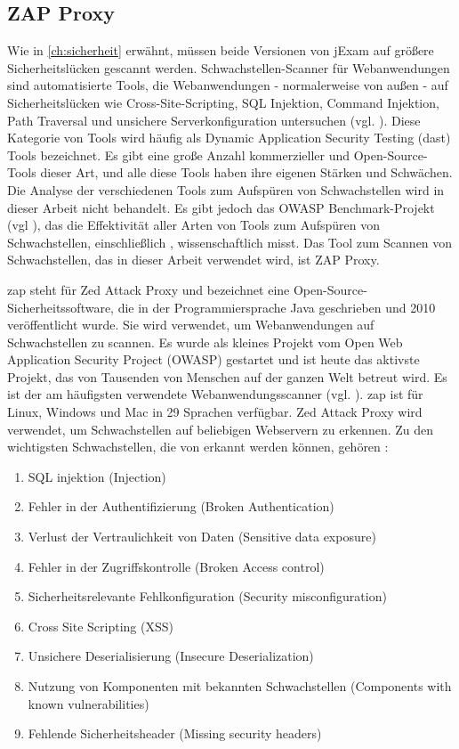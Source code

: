 \subsection{ZAP Proxy}

Wie in \autoref{ch:sicherheit} erwähnt, müssen beide Versionen von jExam
auf größere Sicherheitslücken gescannt werden. Schwachstellen-Scanner für
Webanwendungen sind automatisierte Tools, die Webanwendungen - normalerweise
von außen - auf Sicherheitslücken wie Cross-Site-Scripting, SQL Injektion,
Command Injektion, Path Traversal und unsichere Serverkonfiguration
untersuchen (vgl. \cite{vulscan}). Diese Kategorie von Tools wird häufig
als Dynamic Application Security Testing (\acs{dast}) Tools bezeichnet.
Es gibt eine große Anzahl kommerzieller und Open-Source-Tools dieser Art,
und alle diese Tools haben ihre eigenen Stärken und Schwächen. Die Analyse
der verschiedenen Tools zum Aufspüren von Schwachstellen wird in dieser
Arbeit nicht behandelt. Es gibt jedoch das OWASP Benchmark-Projekt
(vgl \cite{benchmark}), das die Effektivität aller Arten von Tools zum
Aufspüren von Schwachstellen, einschließlich , wissenschaftlich
misst. Das Tool zum Scannen von Schwachstellen, das in dieser Arbeit verwendet wird,
ist ZAP Proxy.

\acs{zap} steht für Zed Attack Proxy und bezeichnet eine
Open-Source-Sicherheitssoftware, die in der Programmiersprache Java
geschrieben und 2010 veröffentlicht wurde. Sie wird verwendet, um
Webanwendungen auf Schwachstellen zu scannen. Es wurde als kleines
Projekt vom Open Web Application Security Project (OWASP) gestartet und
ist heute das aktivste Projekt, das von Tausenden von Menschen auf der
ganzen Welt betreut wird. Es ist der am häufigsten verwendete
Webanwendungsscanner (vgl. \cite{zap}). \acs{zap} ist für Linux, Windows und Mac
in 29 Sprachen verfügbar. Zed Attack Proxy wird verwendet, um
Schwachstellen auf beliebigen Webservern zu erkennen. Zu den wichtigsten
Schwachstellen, die von  erkannt werden können, gehören :

\begin{enumerate}
    \item SQL injektion (Injection)
    \item Fehler in der Authentifizierung (Broken Authentication)
    \item Verlust der Vertraulichkeit von Daten (Sensitive data exposure)
    \item Fehler in der Zugriffskontrolle (Broken Access control)
    \item Sicherheitsrelevante Fehlkonfiguration (Security misconfiguration)
    \item Cross Site Scripting (XSS)
    \item Unsichere Deserialisierung (Insecure Deserialization)
    \item Nutzung von Komponenten mit bekannten Schwachstellen (Components with known vulnerabilities)
    \item Fehlende Sicherheitsheader (Missing security headers)
\end{enumerate}

